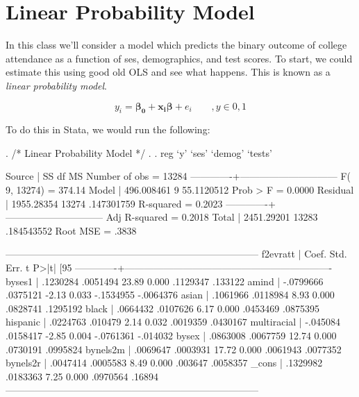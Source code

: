 \documentclass[12pt]{article}
\begin{document}
\section{Linear Probability Model}

In this class we'll consider a model which predicts the binary outcome
of college attendance as a function of ses, demographics, and test
scores. To start, we could estimate this using good old OLS and
see what happens. This is known as a \textit{linear probability
  model}.

\begin{equation*}
  y_i=\mathbf{\beta_0 + x_i\beta} + e_i \qquad, y \in {0,1}
\end{equation*}


To do this in Stata, we would run the following:

\begin{stlog}

. /* Linear Probability Model */
. 
. reg `y' `ses' `demog' `tests'

      Source |       SS       df       MS              Number of obs =   13284
-------------+------------------------------           F(  9, 13274) =  374.14
       Model |  496.008461     9  55.1120512           Prob > F      =  0.0000
    Residual |  1955.28354 13274  .147301759           R-squared     =  0.2023
-------------+------------------------------           Adj R-squared =  0.2018
       Total |  2451.29201 13283  .184543552           Root MSE      =   .3838

------------------------------------------------------------------------------
    f2evratt |      Coef.   Std. Err.      t    P>|t|     [95%
-------------+----------------------------------------------------------------
      byses1 |   .1230284   .0051494    23.89   0.000     .1129347     .133122
       amind |  -.0799666   .0375121    -2.13   0.033    -.1534955   -.0064376
       asian |   .1061966   .0118984     8.93   0.000     .0828741    .1295192
       black |   .0664432   .0107626     6.17   0.000     .0453469    .0875395
    hispanic |   .0224763    .010479     2.14   0.032     .0019359    .0430167
 multiracial |   -.045084   .0158417    -2.85   0.004    -.0761361    -.014032
       bysex |   .0863008   .0067759    12.74   0.000     .0730191    .0995824
    bynels2m |   .0069647   .0003931    17.72   0.000     .0061943    .0077352
    bynels2r |   .0047414   .0005583     8.49   0.000      .003647    .0058357
       _cons |   .1329982   .0183363     7.25   0.000     .0970564      .16894
------------------------------------------------------------------------------
 
  \end{stlog}
\end{document}
